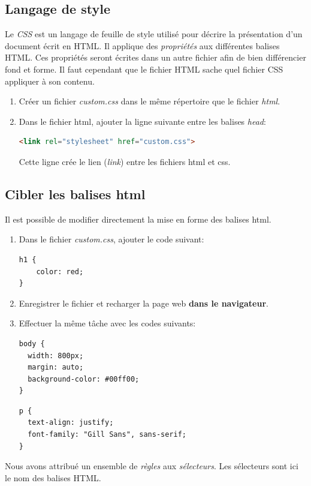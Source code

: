\documentclass[a4paper,11pt]{article}
\begin{document}
\begin{Form}
\subsection{Langage de style}
Le \emph{CSS} est un langage de feuille de style utilisé pour décrire la présentation d'un document écrit en HTML. Il applique des \emph{propriétés} aux différentes balises HTML. Ces propriétés seront écrites dans un autre fichier afin de bien différencier fond et forme. Il faut cependant que le fichier HTML sache quel fichier CSS appliquer à son contenu.
\begin{activite}
\begin{enumerate}
\item Créer un fichier \emph{custom.css} dans le même répertoire que le fichier \emph{html}.
\item Dans le fichier html, ajouter la ligne suivante entre les balises \emph{head}:
\begin{lstlisting}[language=html]
<link rel="stylesheet" href="custom.css">
\end{lstlisting}
Cette ligne crée le lien (\emph{link}) entre les fichiers html et css.
\end{enumerate}
\end{activite}
\subsection{Cibler les balises html}
Il est possible de modifier directement la mise en forme des balises html.
\begin{activite}
\begin{enumerate}
\item Dans le fichier \emph{custom.css}, ajouter le code suivant:
\begin{center}
\begin{lstlisting}
h1 {
	color: red;
}
\end{lstlisting}
\label{h1}
\end{center}
\item Enregistrer le fichier et recharger la page web \textbf{dans le navigateur}.
\item Effectuer la même tâche avec les codes suivants:
\begin{lstlisting}
body {
  width: 800px;
  margin: auto;
  background-color: #00ff00;
}
\end{lstlisting}
\begin{lstlisting}
p {
  text-align: justify;
  font-family: "Gill Sans", sans-serif;
}
\end{lstlisting}
\end{enumerate}
\end{activite}
Nous avons attribué un ensemble de \emph{règles} aux \emph{sélecteurs}. Les sélecteurs sont ici le nom des balises HTML.

\end{Form}
\end{document}
